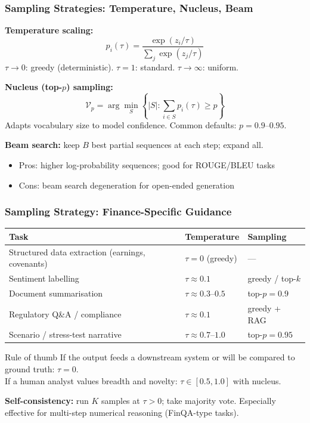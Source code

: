 \documentclass[9pt,t]{beamer}
\begin{document}
\begin{frame}
\frametitle{Sampling Strategies: Temperature, Nucleus, Beam}

\textbf{Temperature scaling:}
\[
p_i(\tau) = \frac{\exp(z_i/\tau)}{\sum_j \exp(z_j/\tau)}
\]
$\tau \to 0$: greedy (deterministic). \quad $\tau = 1$: standard. \quad $\tau \to \infty$: uniform.

\medskip
\textbf{Nucleus (top-$p$) sampling:}
\[
\mathcal{V}_p = \arg\min_S \!\left\{|S| : \sum_{i \in S} p_i(\tau) \geq p\right\}
\]
Adapts vocabulary size to model confidence. Common defaults: $p = 0.9$--$0.95$.

\medskip
\textbf{Beam search:} keep $B$ best partial sequences at each step; expand all.
\begin{itemize}
  \item Pros: higher log-probability sequences; good for ROUGE/BLEU tasks
  \item Cons: beam search degeneration for open-ended generation
\end{itemize}
\end{frame}

\begin{frame}
\frametitle{Sampling Strategy: Finance-Specific Guidance}

\small
\begin{tabular}{lll}
\toprule
\textbf{Task} & \textbf{Temperature} & \textbf{Sampling} \\
\midrule
Structured data extraction (earnings, covenants) & $\tau = 0$ (greedy)   & --- \\
Sentiment labelling                               & $\tau \approx 0.1$    & greedy / top-$k$ \\
Document summarisation                            & $\tau \approx 0.3$--$0.5$ & top-$p = 0.9$ \\
Regulatory Q\&A / compliance                     & $\tau \approx 0.1$    & greedy + RAG \\
Scenario / stress-test narrative                  & $\tau \approx 0.7$--$1.0$ & top-$p = 0.95$ \\
\bottomrule
\end{tabular}

\normalsize
\medskip
\begin{block}{Rule of thumb}
If the output feeds a downstream system or will be compared to ground truth: $\tau = 0$.\\
If a human analyst values breadth and novelty: $\tau \in [0.5, 1.0]$ with nucleus.
\end{block}

\medskip
\textbf{Self-consistency:} run $K$ samples at $\tau > 0$; take majority vote.
Especially effective for multi-step numerical reasoning (FinQA-type tasks).
\end{frame}
\end{document}

